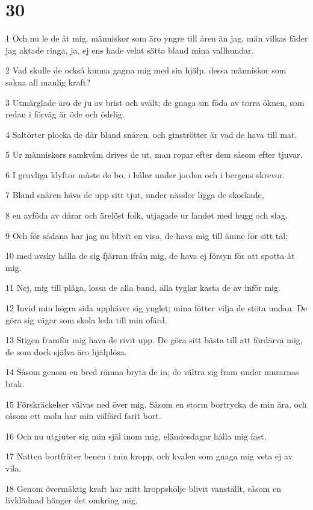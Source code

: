 \chapter{30}

\par 1 Och nu le de åt mig, människor som äro yngre till åren än jag, män vilkas fäder jag aktade ringa, ja, ej ens hade velat sätta bland mina vallhundar.
\par 2 Vad skulle de också kunna gagna mig med sin hjälp, dessa människor som sakna all manlig kraft?
\par 3 Utmärglade äro de ju av brist och svält; de gnaga sin föda av torra öknen, som redan i förväg är öde och ödslig.
\par 4 Saltörter plocka de där bland snåren, och ginströtter är vad de hava till mat.
\par 5 Ur människors samkväm drives de ut, man ropar efter dem såsom efter tjuvar.
\par 6 I gruvliga klyftor måste de bo, i hålor under jorden och i bergens skrevor.
\par 7 Bland snåren häva de upp sitt tjut, under nässlor ligga de skockade,
\par 8 en avföda av dårar och ärelöst folk, utjagade ur landet med hugg och slag.
\par 9 Och för sådana har jag nu blivit en visa, de hava mig till ämne för sitt tal;
\par 10 med avsky hålla de sig fjärran ifrån mig, de hava ej försyn för att spotta åt mig.
\par 11 Nej, mig till plåga, lossa de alla band, alla tyglar kasta de av inför mig.
\par 12 Invid min högra sida upphäver sig ynglet; mina fötter vilja de stöta undan. De göra sig vägar som skola leda till min ofärd.
\par 13 Stigen framför mig hava de rivit upp. De göra sitt bästa till att fördärva mig, de som dock själva äro hjälplösa.
\par 14 Såsom genom en bred rämna bryta de in; de vältra sig fram under murarnas brak.
\par 15 Förskräckelser välvas ned över mig. Såsom en storm bortrycka de min ära, och såsom ett moln har min välfärd farit bort.
\par 16 Och nu utgjuter sig min själ inom mig, eländesdagar hålla mig fast.
\par 17 Natten bortfräter benen i min kropp, och kvalen som gnaga mig veta ej av vila.
\par 18 Genom övermäktig kraft har mitt kroppshölje blivit vanställt, såsom en livklädnad hänger det omkring mig.
